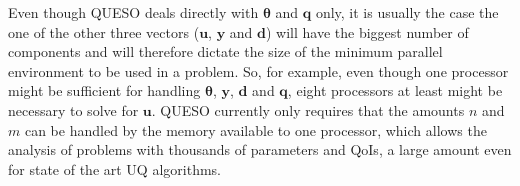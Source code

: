 %
Even though QUESO deals directly with $\boldsymbol{\theta}$ and $\mathbf{q}$ only,
it is usually the case the one of the other three vectors ($\mathbf{u}$, $\mathbf{y}$ and $\mathbf{d}$) will have the biggest number of components and will therefore
dictate the size of the minimum parallel environment to be used in a problem.
%
So, for example, even though one processor might be sufficient for handling $\boldsymbol{\theta}$, $\mathbf{y}$, $\mathbf{d}$ and $\mathbf{q}$,
eight processors at least might be necessary to solve for $\mathbf{u}$.
QUESO currently only requires that the amounts $n$ and $m$ can be handled by the memory available to one processor,
which allows the analysis of problems with thousands of parameters and QoIs, a large amount even for state of the art UQ algorithms.

